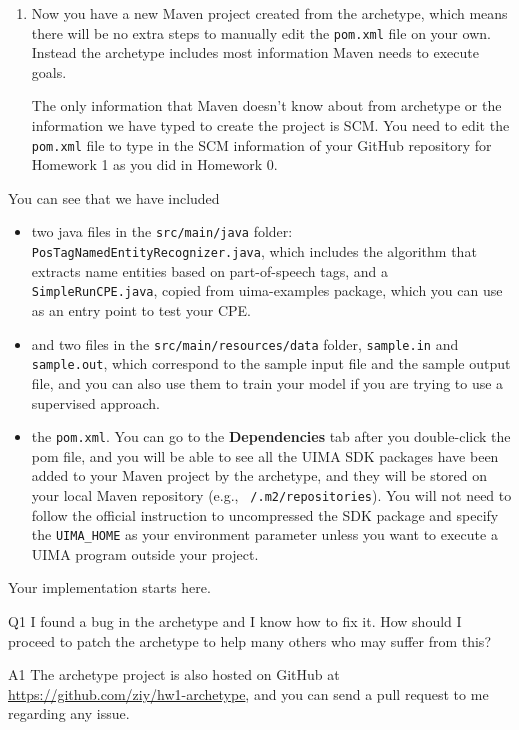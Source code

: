 \begin{enumerate}
\item Now you have a new Maven project created from the archetype, which means
there will be no extra steps to manually edit the \verb|pom.xml| file on your
own. Instead the archetype includes most information Maven needs to execute
goals.

The only information that Maven doesn't know about from archetype or the
information we have typed to create the project is SCM. You need to edit the
\texttt{pom.xml} file to type in the SCM information of your GitHub repository
for Homework 1 as you did in Homework 0.

\end{enumerate}

You can see that we have included

\begin{itemize}

\item two java files in the \texttt{src/main/java} folder:
\texttt{PosTagNamedEntityRecognizer.java}, which includes the algorithm that
extracts name entities based on part-of-speech tags, and a
\texttt{SimpleRunCPE.java}, copied from uima-examples package, which you can use
as an entry point to test your CPE.

\item and two files in the \texttt{src/main/resources/data} folder,
\texttt{sample.in} and \texttt{sample.out}, which correspond to the sample input
file and the sample output file, and you can also use them to train your model
if you are trying to use a supervised approach.

\item the \texttt{pom.xml}. You can go to the \textbf{Dependencies} tab after
you double-click the pom file, and you will be able to see all the UIMA SDK
packages have been added to your Maven project by the archetype, and they will
be stored on your local Maven repository (e.g., \texttt{~/.m2/repositories}).
You will not need to follow the official instruction to uncompressed the SDK
package and specify the \verb|UIMA_HOME| as your environment parameter unless
you want to execute a UIMA program outside your project.

\end{itemize}

Your implementation starts here.

\begin{qa}

\item[Q1] I found a bug in the archetype and I know how to fix it. How should I
proceed to patch the archetype to help many others who may suffer from this? 

\item[A1] The archetype project is also hosted on GitHub at
\url{https://github.com/ziy/hw1-archetype}, and you can send a pull request to
me regarding any issue.

\end{qa}
